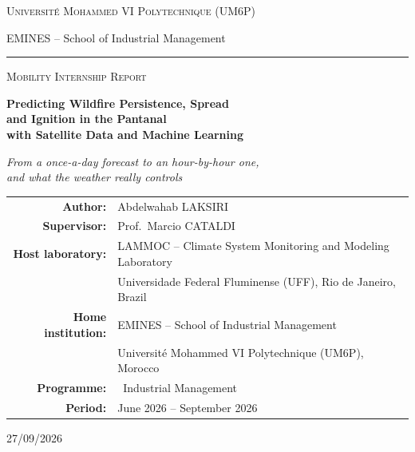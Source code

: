 \documentclass[11pt,a4paper,oneside]{report}
\newcommand{\InternshipPeriod}{June 2026 -- September 2026}
\newcommand{\ReportDate}{27/09/2026}
\newcommand{\Programme}{\ Industrial Management}
\begin{document}
\begin{titlepage}
\centering
{\large\scshape Université Mohammed VI Polytechnique (UM6P)\par}
{\large EMINES -- School of Industrial Management\par}
\vspace{0.3cm}
{\color{fire}\rule{\linewidth}{1.2pt}\par}
\vspace{0.9cm}
{\Large\scshape Mobility Internship Report\par}
\vspace{1.0cm}
{\huge\bfseries\color{ink}
Predicting Wildfire Persistence, Spread\\[0.25em]
and Ignition in the Pantanal\\[0.25em]
with Satellite Data and Machine Learning\par}
\vspace{0.7cm}
{\large\itshape From a once-a-day forecast to an hour-by-hour one,\\
and what the weather really controls\par}
\vspace{1.4cm}

\begin{tabular}{rl}
\textbf{Author:}      & Abdelwahab \textsc{LAKSIRI} \\[0.3em]
\textbf{Supervisor:}  & Prof.\ Marcio \textsc{CATALDI} \\[0.3em]
\textbf{Host laboratory:} & LAMMOC -- Climate System Monitoring and Modeling Laboratory \\
                      & Universidade Federal Fluminense (UFF), Rio de Janeiro, Brazil \\[0.3em]
\textbf{Home institution:} & EMINES -- School of Industrial Management \\
                      & Université Mohammed VI Polytechnique (UM6P), Morocco \\[0.3em]
\textbf{Programme:}   & \Programme \\[0.3em]
\textbf{Period:}      & \InternshipPeriod \\
\end{tabular}

\vfill
{}\par
\vspace{0.4cm}
{\large \ReportDate\par}
\restoregeometry
\end{titlepage}
\end{document}
